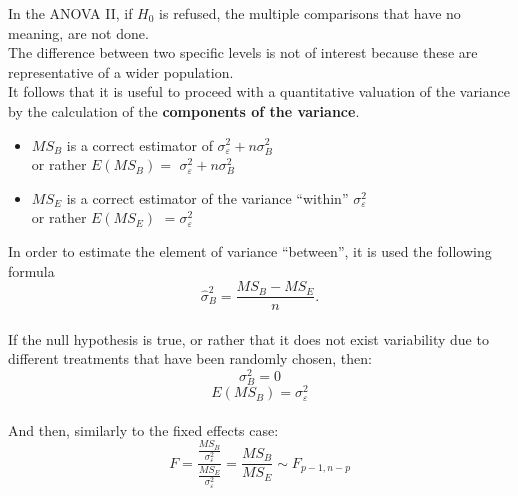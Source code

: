 \begin{frame}
  In the ANOVA II, if $ H_0 $ is refused, the multiple comparisons that have no meaning, are not done.\\
  The difference between two specific levels is not of interest because these are representative of a wider population.\\ 
  \vspace{.25cm}
  It follows that it is useful to proceed with a quantitative valuation of the variance by the calculation of the  \textbf{components of the variance}.\\
  \vspace*{.25cm}
  \begin{itemize}
    \item $MS_B$ is a correct estimator of $ \sigma^{2}_{\varepsilon}+n \sigma^{2}_{B} $\\
      \vspace*{.25cm}
      or rather $E(MS_B)=$ $\sigma^{2}_{\varepsilon}+n \sigma^{2}_{B}$\\
    \vspace*{.75cm}
    \item $MS_E$ is a correct estimator of the variance ``within'' $ \sigma^{2}_{\varepsilon} $\\ 
      \vspace*{.25cm}
      or rather $E(MS_E)$ $=\sigma^{2}_{\varepsilon}$
  \end{itemize}
\end{frame}

\begin{frame}
  \vspace*{.25cm} 
  In order to estimate the element of variance ``between'', it is used the following formula\\
  $$ \hat{\sigma}^{2}_{B}=\frac{MS_B-MS_E}{n} \mbox{.} $$\\
  \vspace*{.25cm}
  If the null hypothesis is true, or rather that it does not exist variability due to different treatments that have been randomly chosen, then:
  $$ \sigma^{2}_{B}=0 $$ 
  $$ E(MS_B)=\sigma^{2}_{\varepsilon} $$ \\
  \vspace*{.25cm}
  And then, similarly to the fixed effects case:
  $$ F=\dfrac{\frac{MS_B}{\sigma^{2}_{\varepsilon}}}{\frac{MS_E}{\sigma^{2}_{\varepsilon}}}=\frac{MS_B}{MS_E}\sim F_{p-1,n-p} $$
\end{frame}

